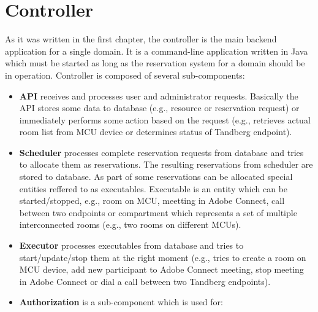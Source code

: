 \chapter{Controller}

As it was written in the first chapter, the controller is the main backend application for a single domain. It is a command-line application written in Java which must be started as long as the reservation system for a domain should be in operation.
Controller is composed of several sub-components:

\begin{itemize}

\item \textbf{API} receives and processes user and administrator requests. Basically the API stores some data to database (e.g., resource or reservation request) or immediately performs some action based on the request (e.g., retrieves actual room list from MCU device or determines status of Tandberg endpoint).

\item \textbf{Scheduler} processes complete reservation requests from database and tries to allocate them as reservations. The resulting reservations from scheduler are stored to database. As part of some reservations can be allocated special entities reffered to as executables. Executable is an entity which can be started/stopped, e.g., room on MCU, meetting in Adobe Connect, call between two endpoints or compartment which represents a set of multiple interconnected rooms (e.g., two rooms on different MCUs).

\item \textbf{Executor} processes executables from database and tries to start/update/stop them at the right moment (e.g., tries to create a room on MCU device, add new participant to Adobe Connect meeting, stop meeting in Adobe Connect or dial a call between two Tandberg endpoints).

\item \textbf{Authorization} is a sub-component which is used for:

\end{itemize}

